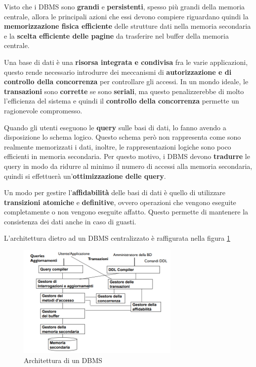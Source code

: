 Visto che i DBMS sono \textbf{grandi} e \textbf{persistenti}, spesso più grandi
della memoria centrale, allora le principali azioni che essi devono compiere
riguardano quindi la \textbf{memorizzazione fisica efficiente} delle strutture
dati nella memoria secondaria e la \textbf{scelta efficiente delle pagine} da
trasferire nel buffer della memoria centrale.

Una base di dati è una \textbf{risorsa integrata e condivisa} fra le varie
applicazioni, questo rende necessario introdurre dei meccanismi di
\textbf{autorizzazione e di controllo della concorrenza} per controllare gli
accessi. In un mondo ideale, le \textbf{transazioni} sono \textbf{corrette} se
sono \textbf{seriali}, ma questo penalizzerebbe di molto l'efficienza del sistema e
quindi il \textbf{controllo della concorrenza} permette un ragionevole compromesso.

Quando gli utenti eseguono le \textbf{query} sulle basi di dati, lo fanno avendo
a disposizione lo schema logico. Questo schema però non rappresenta come sono
realmente memorizzati i dati, inoltre, le rappresentazioni logiche sono poco
efficienti in memoria secondaria. Per questo motivo, i DBMS devono
\textbf{tradurre} le query in modo da ridurre al minimo il numero di accessi
alla memoria secondaria, quindi si effettuerà un'\textbf{ottimizzazione delle query}.

Un modo per gestire l'\textbf{affidabilità} delle basi di dati è quello di utilizzare
\textbf{transizioni atomiche} e \textbf{definitive}, ovvero operazioni che
vengono eseguite completamente o non vengono eseguite affatto. Questo permette
di mantenere la consistenza dei dati anche in caso di guasti.

L'architettura dietro ad un DBMS centralizzato è raffigurata nella figura \ref{fig:DBMS_architecture}
\begin{figure}[!ht]
      \centering
      \includegraphics[width=0.7\textwidth]{./img/DBMS/Architettura.png}
      \caption{Architettura di un DBMS}
      \label{fig:DBMS_architecture}
\end{figure}
